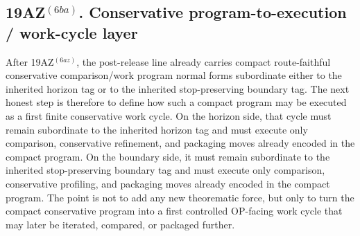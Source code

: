 \subsection*{19AZ$^{(6ba)}$. Conservative program-to-execution / work-cycle layer}
\label{sec:first-conservative-op-facing-program-to-execution-work-cycle-layer-extracted-from-the-program-normal-form}
After 19AZ$^{(6az)}$, the post-release line already carries compact route-faithful conservative comparison/work program normal forms subordinate either to the inherited horizon tag or to the inherited stop-preserving boundary tag. The next honest step is therefore to define how such a compact program may be executed as a first finite conservative work cycle. On the horizon side, that cycle must remain subordinate to the inherited horizon tag and must execute only comparison, conservative refinement, and packaging moves already encoded in the compact program. On the boundary side, it must remain subordinate to the inherited stop-preserving boundary tag and must execute only comparison, conservative profiling, and packaging moves already encoded in the compact program. The point is not to add any new theorematic force, but only to turn the compact conservative program into a first controlled OP-facing work cycle that may later be iterated, compared, or packaged further.

